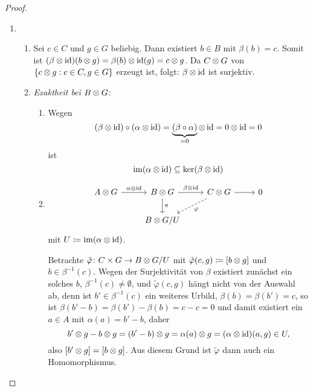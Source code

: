 \begin{proof}
  \begin{enumerate}
    \item
      \begin{enumerate}
        \item
          Sei $c \in C$ und $g \in G$ beliebig.
          Dann existiert $b \in B$ mit $\beta(b) = c$.
          Somit ist $(\beta \otimes \operatorname{id}) (b \otimes g) = \beta(b) \otimes \operatorname{id}(g) = c \otimes g$.
          Da $C \otimes G$ von $\left\{ c \otimes g : c \in C, g \in G \right\}$ erzeugt ist, folgt: $\beta \otimes \operatorname{id}$ ist surjektiv.
        \item
          \emph{Exaktheit bei $B \otimes G$}:
          \begin{enumerate}[($\alpha$)]
            \item
              Wegen
              \begin{equation*}
                (\beta \otimes \operatorname{id}) \circ (\alpha \otimes \operatorname{id}) = \underbrace{(\beta \circ \alpha)}_{= 0} \otimes \operatorname{id} = 0 \otimes \operatorname{id} = 0
              \end{equation*}
              ist
              \begin{equation*}
                \operatorname{im} (\alpha \otimes \operatorname{id}) \subseteq \ker (\beta \otimes \operatorname{id})
              \end{equation*}
            \item
              \begin{equation*}
                \begin{tikzcd}
                  A \tensor G
                    \arrow{r}{\alpha \tensor \id}
                  & B \tensor G
                    \arrow{r}{\beta \tensor \id}
                    \arrow{d}{\pi}
                  & C \tensor G
                    \arrow{r}{}
                    \arrow[dashed]{dl}{\varphi}
                  & 0\\
                  & B \tensor G / U
                \end{tikzcd}
              \end{equation*}
              mit $U \coloneqq \operatorname{im}(\alpha \otimes \operatorname{id})$.

              Betrachte $\tilde \varphi \colon C \times G \to B \otimes G / U$ mit $\tilde \varphi (c,g) \coloneqq [ b \otimes g ]$ und $b \in \beta^{-1}(c)$.
              Wegen der Surjektivität von $\beta$ existiert zunächst ein solches $b$, $\beta^{-1}(c) \neq \emptyset$, und $\tilde \varphi(c,g)$ hängt nicht von der Auswahl ab, denn ist $b' \in \beta^{-1}(c)$ ein weiteres Urbild, $\beta(b) = \beta(b') = c$, so ist $\beta(b' - b) = \beta(b') - \beta(b) = c - c = 0$ und damit existiert ein $a \in A$ mit $\alpha(a) = b' - b$, daher
              \begin{equation*}
                b' \otimes g - b \otimes g = (b' - b) \otimes g = \alpha(a) \otimes g = (\alpha \otimes \operatorname{id})(a, g) \in U,
              \end{equation*}
              also $[b' \otimes g] = [b \otimes g]$.
              Aus diesem Grund ist $\tilde \varphi$ dann auch ein Homomorphismus.


\end{enumerate}
\end{enumerate}
\end{enumerate}
\end{proof}
